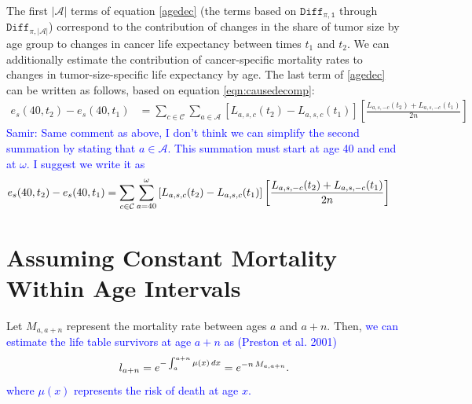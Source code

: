 \documentclass[11pt,letterpaper]{article}
\theoremstyle{plain}
\theoremstyle{remark}
\numberwithin{equation}{section}
\begin{document}
The first $\left\vert\mathcal{A}\right\vert$ terms of equation
\eqref{agedec} (the terms based on $\mathtt{Diff_{\pi,1}}$ through
$\mathtt{Diff_{\pi,{\left\vert\mathcal{A}\right\vert}}}$) correspond
to the contribution of changes in the share of tumor size by age group
to changes in cancer life expectancy between times $t_1$ and $t_2$. We
can additionally estimate the contribution of cancer-specific
mortality rates to changes in tumor-size-specific life expectancy by
age. The last term of \eqref{agedec} can be written as follows, based
on equation \eqref{eqn:causedecomp}:
%
\begin{align}
  e_s(40,t_2)-e_s(40,t_1)&=\sum_{c\in\mathcal{C}} \sum_{a\in\mathcal{A}}\left[L_{a,s,c}(t_2)-L_{a,s,c}(t_1) \right] \left[\frac{L_{a,s,-c}(t_2)+L_{a,s,-c}(t_1) }{2n} \right] 
\end{align}
\textcolor{blue}{Samir: Same comment as above, I don't think we can simplify the second summation by stating that $a\in\mathcal{A}$. This summation must start at age 40 and end at $\omega$.  I suggest we write it as  
\begin{align}
  e_s(40,t_2)-e_s(40,t_1)&=\sum_{c\in\mathcal{C}} \sum_{a=40}^\omega\left[L_{a,s,c}(t_2)-L_{a,s,c}(t_1) \right] \left[\frac{L_{a,s,-c}(t_2)+L_{a,s,-c}(t_1) }{2n} \right]  \notag
\end{align} }


\section{Assuming Constant Mortality Within Age Intervals}
Let $M_{a,a+n}$ represent the mortality rate between ages $a$ and
$a+n$. Then, \textcolor{blue}{we can estimate the life table survivors at age $a+n$ as (Preston et al. 2001)}
\begin{equation}
l_{a+n}=e^{-\int_a^{a+n}\mu(x)\,dx}=e^{-n\,M_{a,a+n}}.\notag
\end{equation}
\textcolor{blue}{where $\mu(x)$ represents the risk of death at age $x$.}
\end{document}
